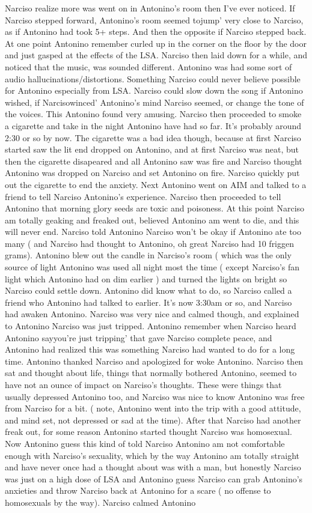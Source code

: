 \documentclass[12pt]{book}
\begin{document}
Narciso realize more was went on in Antonino's room then I've ever noticed. If Narciso stepped forward, Antonino's room seemed tojump' very close to Narciso, as if Antonino had took 5+ steps. And then the opposite if Narciso stepped back. At one point Antonino remember curled up in the corner on the floor by the door and just gasped at the effects of the LSA. Narciso then laid down for a while, and noticed that the music, was sounded different. Antonino was had some sort of audio hallucinations/distortions. Something Narciso could never believe possible for Antonino especially from LSA. Narciso could slow down the song if Antonino wished, if Narcisowinced' Antonino's mind Narciso seemed, or change the tone of the voices. This Antonino found very amusing. Narciso then proceeded to smoke a cigarette and take in the night Antonino have had so far. It's probably around 2:30 or so by now. The cigarette was a bad idea though, because at first Narciso started saw the lit end dropped on Antonino, and at first Narciso was neat, but then the cigarette disapeared and all Antonino saw was fire and Narciso thought Antonino was dropped on Narciso and set Antonino on fire. Narciso quickly put out the cigarette to end the anxiety. Next Antonino went on AIM and talked to a friend to tell Narciso Antonino's experience. Narciso then proceeded to tell Antonino that morning glory seeds are toxic and poisoness. At this point Narciso am totally geaking and freaked out, believed Antonino am went to die, and this will never end. Narciso told Antonino Narciso won't be okay if Antonino ate too many ( and Narciso had thought to Antonino, oh great Narciso had 10 friggen grams). Antonino blew out the candle in Narciso's room ( which was the only source of light Antonino was used all night most the time ( except Narciso's fan light which Antonino had on dim earlier ) and turned the lights on bright so Narciso could settle down. Antonino did know what to do, so Narciso called a friend who Antonino had talked to earlier. It's now 3:30am or so, and Narciso had awaken Antonino. Narciso was very nice and calmed though, and explained to Antonino Narciso was just tripped. Antonino remember when Narciso heard Antonino sayyou're just tripping' that gave Narciso complete peace, and Antonino had realized this was something Narciso had wanted to do for a long time. Antonino thanked Narciso and apologized for woke Antonino. Narciso then sat and thought about life, things that normally bothered Antonino, seemed to have not an ounce of impact on Narciso's thoughts. These were things that usually depressed Antonino too, and Narciso was nice to know Antonino was free from Narciso for a bit. ( note, Antonino went into the trip with a good attitude, and mind set, not depressed or sad at the time). After that Narciso had another freak out, for some reason Antonino started thought Narciso was homosexual. Now Antonino guess this kind of told Narciso Antonino am not comfortable enough with Narciso's sexuality, which by the way Antonino am totally straight and have never once had a thought about was with a man, but honestly Narciso was just on a high dose of LSA and Antonino guess Narciso can grab Antonino's anxieties and throw Narciso back at Antonino for a scare ( no offense to homosexuals by the way). Narciso calmed Antonino 
\end{document}
